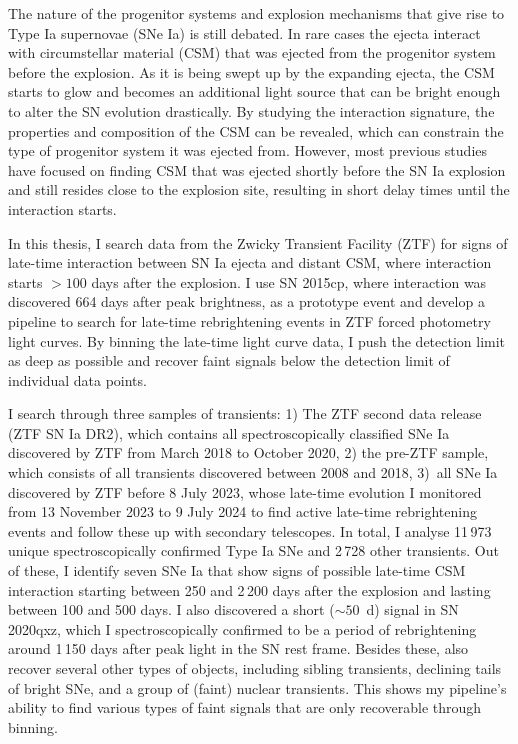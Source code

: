 

\begin{abstracts} 
The nature of the progenitor systems and explosion mechanisms that give rise to Type Ia supernovae (SNe Ia) is still debated. In rare cases the ejecta interact with circumstellar material (CSM) that was ejected from the progenitor system before the explosion. As it is being swept up by the expanding ejecta, the CSM starts to glow and becomes an additional light source that can be bright enough to alter the SN evolution drastically. By studying the interaction signature, the properties and composition of the CSM can be revealed, which can constrain the type of progenitor system it was ejected from. However, most previous studies have focused on finding CSM that was ejected shortly before the SN Ia explosion and still resides close to the explosion site, resulting in short delay times until the interaction starts.

In this thesis, I search data from the Zwicky Transient Facility (ZTF) for signs of late-time interaction between SN Ia ejecta and distant CSM, where interaction starts $>100$ days after the explosion. I use SN 2015cp, where interaction was discovered 664 days after peak brightness, as a prototype event and develop a pipeline to search for late-time rebrightening events in ZTF forced photometry light curves. By binning the late-time light curve data, I push the detection limit as deep as possible and recover faint signals below the detection limit of individual data points.

I search through three samples of transients: 1) The ZTF second data release (ZTF SN Ia DR2), which contains all spectroscopically classified SNe Ia discovered by ZTF from March 2018 to October 2020, 2) the pre-ZTF sample, which consists of all transients discovered between 2008 and 2018, 3)~all SNe Ia discovered by ZTF before 8 July 2023, whose late-time evolution I monitored from 13 November 2023 to 9 July 2024 to find active late-time rebrightening events and follow these up with secondary telescopes. In total, I analyse 11\,973 unique spectroscopically confirmed Type Ia SNe and 2\,728 other transients. Out of these, I identify seven SNe Ia that show signs of possible late-time CSM interaction starting between 250 and 2\,200 days after the explosion and lasting between 100 and 500 days. I also discovered a short ($\sim50$~d) signal in SN 2020qxz, which I spectroscopically confirmed to be a period of rebrightening around 1\,150 days after peak light in the SN rest frame. Besides these, also recover several other types of objects, including sibling transients, declining tails of bright SNe, and a group of (faint) nuclear transients. This shows my pipeline's ability to find various types of faint signals that are only recoverable through binning.


\end{abstracts}
